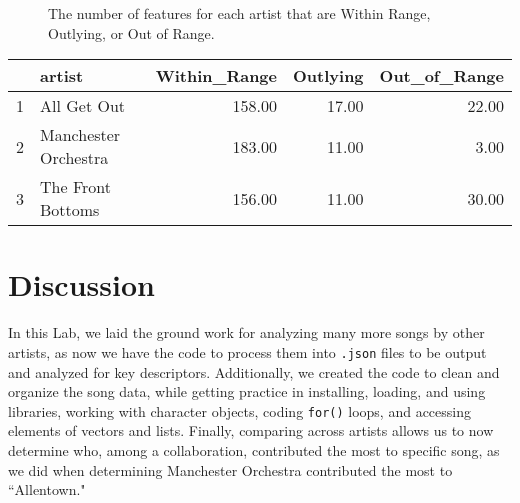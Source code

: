 \documentclass{article}\usepackage[]{graphicx}\usepackage[]{xcolor}
\makeatletter
\newenvironment{kframe}{%
 \def\at@end@of@kframe{}%
 \ifinner\ifhmode%
  \def\at@end@of@kframe{\end{minipage}}%
  \begin{minipage}{\columnwidth}%
 \fi\fi%
 \def\FrameCommand##1{\hskip\@totalleftmargin \hskip-\fboxsep
 \colorbox{shadecolor}{##1}\hskip-\fboxsep
     \hskip-\linewidth \hskip-\@totalleftmargin \hskip\columnwidth}%
 \MakeFramed {\advance\hsize-\width
   \@totalleftmargin\z@ \linewidth\hsize
   \@setminipage}}%
 {\par\unskip\endMakeFramed%
 \at@end@of@kframe}
\newenvironment{knitrout}{}{} %
\makeatother
\begin{document}
\begin{multicols}{2}
\begin{figure}[ht]
\begin{center}
\begin{knitrout}
\begin{kframe}
{\ttfamily\noindent\bfseries\color{errorcolor}{\#\# Error: object 'my\_data\_frame' not found}}

{\ttfamily\noindent\bfseries\color{errorcolor}{\#\# Error: object 'my\_data\_long' not found}}\end{kframe}
\end{knitrout}
\caption{The number of features for each artist that are Within Range, Outlying, or Out of Range.}
  \label{plot1}
  \end{center}
\end{figure}
\columnbreak


\begin{table}[ht]
\centering
\begin{tabular}{rlrrr}
  \hline
 & artist & Within\_Range & Outlying & Out\_of\_Range \\ 
  \hline
1 & All Get Out & 158.00 & 17.00 & 22.00 \\ 
  2 & Manchester Orchestra & 183.00 & 11.00 & 3.00 \\ 
  3 & The Front Bottoms & 156.00 & 11.00 & 30.00 \\ 
   \hline
\end{tabular}
\end{table}


\section{Discussion}
In this Lab, we laid the ground work for analyzing many more songs by other artists, as now we have the code to process them into \texttt{.json} files to be output and analyzed for key descriptors. Additionally, we created the code to clean and organize the song data, while getting practice in installing, loading, and using libraries, working with character objects, coding \texttt{for()} loops, and accessing elements of vectors and lists. Finally, comparing across artists allows us to now determine who, among a collaboration, contributed the most to specific song, as we did when determining Manchester Orchestra contributed the most to ``Allentown."

\vspace{2em}


\begin{tiny}

\end{tiny}
\end{multicols}
\end{document}
